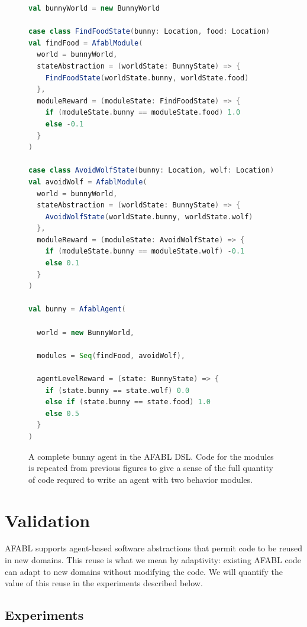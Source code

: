 \begin{figure}[ht]
\begin{center}

\begin{lstlisting}[language=Scala]
val bunnyWorld = new BunnyWorld

case class FindFoodState(bunny: Location, food: Location)
val findFood = AfablModule(
  world = bunnyWorld,
  stateAbstraction = (worldState: BunnyState) => {
    FindFoodState(worldState.bunny, worldState.food)
  },
  moduleReward = (moduleState: FindFoodState) => {
    if (moduleState.bunny == moduleState.food) 1.0
    else -0.1
  }
)

case class AvoidWolfState(bunny: Location, wolf: Location)
val avoidWolf = AfablModule(
  world = bunnyWorld,
  stateAbstraction = (worldState: BunnyState) => {
    AvoidWolfState(worldState.bunny, worldState.wolf)
  },
  moduleReward = (moduleState: AvoidWolfState) => {
    if (moduleState.bunny == moduleState.wolf) -0.1
    else 0.1
  }
)

val bunny = AfablAgent(

  world = new BunnyWorld,

  modules = Seq(findFood, avoidWolf),

  agentLevelReward = (state: BunnyState) => {
    if (state.bunny == state.wolf) 0.0
    else if (state.bunny == state.food) 1.0
    else 0.5
  }
)
\end{lstlisting}

\caption{A complete bunny agent in the AFABL DSL. Code for the modules is repeated from previous figures to give a sense of the full quantity of code requred to write an agent with two behavior modules.}
\end{center}
\label{fig:afabl-bunny-code}
\end{figure}


\section{Validation}

AFABL supports agent-based software abstractions that permit code to be reused in new domains.  This reuse is what we mean by adaptivity: existing AFABL code can adapt to new domains without modifying the code.  We will quantify the value of this reuse in the experiments described below.

\subsection{Experiments}


